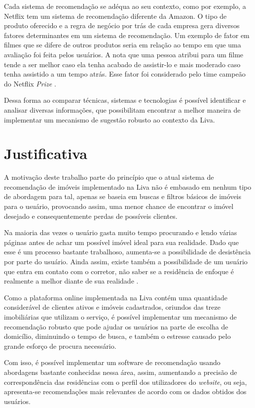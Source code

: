 Cada sistema de recomendação se adéqua ao seu contexto, como por exemplo, a Netflix tem um sistema de recomendação diferente da Amazon. O tipo de produto oferecido e a regra de negócio por trás de cada empresa gera diversos fatores determinantes em um sistema de recomendação. Um exemplo de fator em filmes que se difere de outros produtos seria em relação ao tempo em que uma avaliação foi feita pelos usuários. A nota que uma pessoa atribui para um filme tende a ser melhor caso ela tenha acabado de assistir-lo e mais moderado caso tenha assistido a um tempo atrás. Esse fator foi considerado pelo time campeão do Netflix \textit{Prize} \cite{GARCIA:2015}.
 
 Dessa forma ao comparar técnicas, sistemas e tecnologias é possível identificar e analisar diversas informações, que possibilitam encontrar a melhor maneira de implementar um mecanismo de sugestão robusto ao contexto da Liva.

\section{Justificativa}

A motivação deste trabalho parte do princípio que o atual sistema de recomendação de imóveis implementado na Liva não é embasado em nenhum tipo de abordagem para tal, apenas se baseia em buscas e filtros básicos de imóveis para o usuário, provocando assim, uma menor chance de encontrar o imóvel desejado e consequentemente perdas de possíveis clientes.

Na maioria das vezes o usuário gasta muito tempo procurando e lendo várias páginas antes de achar um possível imóvel ideal para sua realidade. Dado que esse é um processo bastante trabalhoso, aumenta-se a possibilidade de desistência por parte do usuário. Ainda assim, existe também a possibilidade de um usuário que entra em contato com o corretor, não saber se a residência de enfoque é realmente a melhor diante de sua realidade \cite{Summo:2017}.

Como a plataforma online implementada na Liva contém uma quantidade considerável de clientes ativos e imóveis cadastrados, oriundos das treze imobiliárias que utilizam o serviço, é possível implementar um mecanismo de recomendação robusto que pode ajudar os usuários na parte de escolha de domicílio, diminuindo o tempo de busca, e também o estresse causado pelo grande esforço de procura necessário.

Com isso, é possível implementar um software de recomendação usando abordagens bastante conhecidas nessa área, assim, aumentando a precisão de correspondência das residências com o perfil dos utilizadores do \textit{website}, ou seja, apresenta-se recomendações mais relevantes de acordo com os dados obtidos dos usuários.


